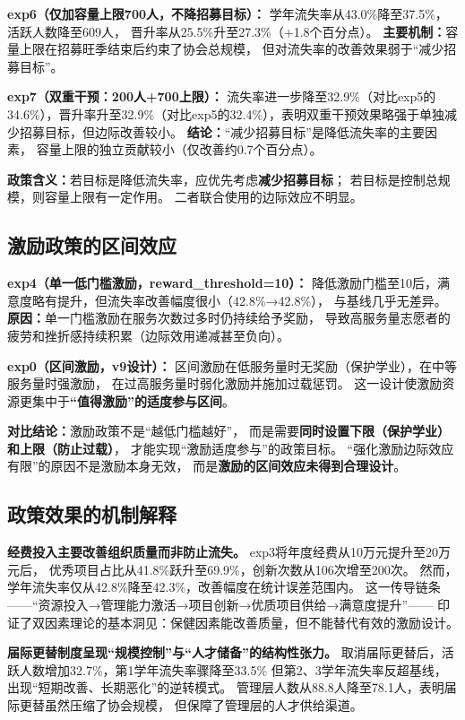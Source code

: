 \documentclass[12pt,a4paper]{article}
\begin{document}
\textbf{exp6（仅加容量上限700人，不降招募目标）：}
学年流失率从43.0\%降至37.5\%，活跃人数降至609人，
晋升率从25.5\%升至27.3\%（+1.8个百分点）。
\textbf{主要机制：}容量上限在招募旺季结束后约束了协会总规模，
但对流失率的改善效果弱于“减少招募目标”。

\textbf{exp7（双重干预：200人+700上限）：}
流失率进一步降至32.9\%（对比exp5的34.6\%），晋升率升至32.9\%（对比exp5的32.4\%），表明双重干预效果略强于单独减少招募目标，但边际改善较小。
\textbf{结论：}“减少招募目标”是降低流失率的主要因素，
容量上限的独立贡献较小（仅改善约0.7个百分点）。

\textbf{政策含义：}若目标是降低流失率，应优先考虑\textbf{减少招募目标}；
若目标是控制总规模，则容量上限有一定作用。
二者联合使用的边际效应不明显。

\subsection{激励政策的区间效应}

\textbf{exp4（单一低门槛激励，reward\_threshold=10）：}
降低激励门槛至10后，满意度略有提升，但流失率改善幅度很小（42.8\%→42.8\%），
与基线几乎无差异。
\textbf{原因：}单一门槛激励在服务次数过多时仍持续给予奖励，
导致高服务量志愿者的疲劳和挫折感持续积累（边际效用递减甚至负向）。

\textbf{exp0（区间激励，v9设计）：}
区间激励在低服务量时无奖励（保护学业），在中等服务量时强激励，
在过高服务量时弱化激励并施加过载惩罚。
这一设计使激励资源更集中于\textbf{“值得激励”的适度参与区间}。

\textbf{对比结论：}激励政策不是“越低门槛越好”，
而是需要\textbf{同时设置下限（保护学业）和上限（防止过载）}，
才能实现“激励适度参与”的政策目标。
“强化激励边际效应有限”的原因不是激励本身无效，
而是\textbf{激励的区间效应未得到合理设计}。

\subsection{政策效果的机制解释}

\textbf{经费投入主要改善组织质量而非防止流失。}
exp3将年度经费从10万元提升至20万元后，
优秀项目占比从41.8\%跃升至69.9\%，创新次数从106次增至200次。
然而，学年流失率仅从42.8\%降至42.3\%，改善幅度在统计误差范围内。
这一传导链条——“资源投入→管理能力激活→项目创新→优质项目供给→满意度提升”——
印证了双因素理论的基本洞见：保健因素能改善质量，但不能替代有效的激励设计。

\textbf{届际更替制度呈现“规模控制”与“人才储备”的结构性张力。}
取消届际更替后，活跃人数增加32.7\%，第1学年流失率骤降至33.5\%
但第2、3学年流失率反超基线，出现“短期改善、长期恶化”的逆转模式。
管理层人数从88.8人降至78.1人，表明届际更替虽然压缩了协会规模，
但保障了管理层的人才供给渠道。
\end{document}
